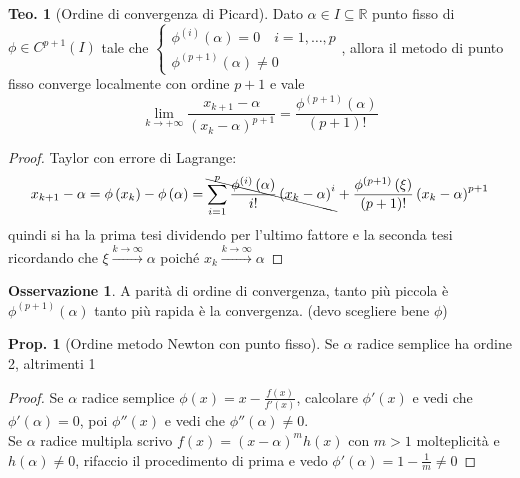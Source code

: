 \documentclass[a4paper,10pt]{article}
\theoremstyle{definition}
\theoremstyle{indentdefinition}
\theoremstyle{indenttheorem}
\newtheorem{thm}{Teo.}
\newtheorem{prop}{Prop.}
\theoremstyle{myremark}
\newtheorem*{rem*}{Osservazione}
\theoremstyle{indentgeneral}
\theoremstyle{plain}
\theoremstyle{plain}
\newenvironment{myboxed} 
{\noindent\begin{lrbox}{\mybox}\begin{minipage}{\textwidth}}
{\end{minipage}\end{lrbox}\fbox{\usebox{\mybox}}}
\begin{document}
\begin{myboxed}
\begin{thm}[Ordine di convergenza di Picard]
Dato $\alpha\in I\subseteq\mathbb{R}$ punto fisso di $\phi\in C^{p+1}\left(I\right)$
tale che $\begin{cases}
    \phi^{(i)}(\alpha)=0 \quad i=1,\ldots,p\\
     \phi^{(p+1)}(\alpha)\ne0
\end{cases}$,
allora il metodo di punto fisso converge localmente con ordine $p+1$
e vale $$\lim_{k\rightarrow+\infty}\frac{x_{k+1}-\alpha}{\left(x_{k}-\alpha\right)^{p+1}}=\frac{\phi^{\left(p+1\right)}\left(\alpha\right)}{\left(p+1\right)!}$$
\end{thm}
\end{myboxed}

\begin{proof}
Taylor con errore di Lagrange:
\[
x_{k+1}-\alpha=\phi\left(x_{k}\right)-\phi\left(\alpha\right)=\bcancel{\sum_{i=1}^{p}\frac{\phi^{\left(i\right)}\left(\alpha\right)}{i!}\left(x_{k}-\alpha\right)^{i}}+\frac{\phi^{\left(p+1\right)}\left(\xi\right)}{\left(p+1\right)!}\left(x_{k}-\alpha\right)^{p+1}
\]
quindi si ha la prima tesi dividendo per l'ultimo fattore e la seconda tesi ricordando che $\xi\overset{k\to\infty}{\rightarrow}\alpha$ poiché $x_k\overset{k\to\infty}{\rightarrow}\alpha$ 
\end{proof}

\begin{rem*}
    A parità di ordine di convergenza, tanto più piccola è $\phi^{(p+1)}(\alpha)$ tanto più rapida è la convergenza. (devo scegliere bene $\phi$)
\end{rem*}

\begin{myboxed}
\begin{prop}[Ordine metodo Newton con punto fisso]
    Se $\alpha$ radice semplice ha ordine 2, altrimenti 1
\end{prop}
\end{myboxed}
\begin{proof}
    Se $\alpha$ radice semplice $\phi(x)=x-\frac{f(x)}{f'(x)}$, calcolare $\phi'(x)$ e vedi che $\phi'(\alpha)=0$, poi $\phi''(x)$ e vedi che $\phi''(\alpha)\ne 0$.\\
    Se $\alpha$ radice multipla scrivo $f(x)=(x-\alpha)^mh(x)$ con $m>1$ molteplicità e $h(\alpha)\ne 0$, rifaccio il procedimento di prima e vedo $\phi'(\alpha)=1-\frac{1}{m}\ne0$
\end{proof}
\end{document}
